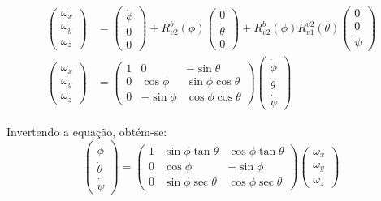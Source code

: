 \documentclass[a4paper, 12pt]{article}
\begin{document}
\begin{equation}
\begin{aligned}
\begin{pmatrix} 
	{ \omega }_{ x } \\ { \omega }_{ y } \\ { \omega}_{ z } 
\end{pmatrix} &= 
\begin{pmatrix} 
	{\dot{\phi}} \\  0 \\ 0 
\end{pmatrix} + 
{ R }_{ v2 }^{ b }(\phi)
\begin{pmatrix} 
 0 \\  {\dot{\theta}} \\ 0 
\end{pmatrix} +
{ R }_{ v2 }^{ b }(\phi){ R }_{ v1 }^{ v2 }(\theta)
\begin{pmatrix} 
0 \\  0 \\ {\dot{\psi}} 
\end{pmatrix} \\
\begin{pmatrix} 
	{ \omega  }_{ x } \\ { \omega  }_{ y } \\ { \omega  }_{ z }
\end{pmatrix} &= 
\begin{pmatrix} 
	1 & 0 & -\sin { \theta  }  \\ 
	0 & \cos { \phi  }  & \sin { \phi \cos { \theta  }  }  \\ 
	0 & -\sin { \phi  }  & \cos { \phi \cos { \theta  }  } 
\end{pmatrix}
\begin{pmatrix} 
	{\dot {\phi}} \\ { \dot {\theta}} \\ { \dot { \psi}} 
\end{pmatrix}
\end{aligned}
\label{eq:cin2}
\end{equation}

\noindent Invertendo a equação, obtém-se:
\begin{equation}
\begin{pmatrix} 
	{\dot {\phi}} \\ { \dot {\theta}} \\ { \dot { \psi}} 
\end{pmatrix} = 
\begin{pmatrix} 
	1 & \sin {\phi\tan{\theta}}& \cos{\phi\tan{\theta}}  \\ 
	0 & \cos {\phi}  & -\sin{\phi}  \\ 
	0 & \sin {\phi\sec{\theta}}  & \cos{\phi\sec{\theta}} 
\end{pmatrix}
\begin{pmatrix} 
	{ \omega  }_{ x } \\ { \omega  }_{ y } \\ { \omega  }_{ z }
\end{pmatrix} 
\end{equation}
\end{document}
